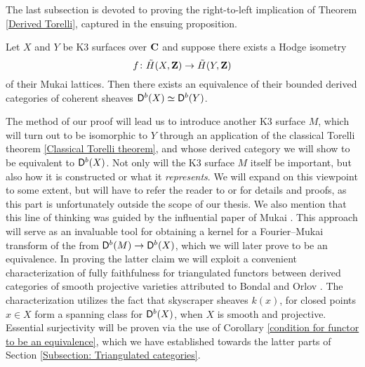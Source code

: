 The last subsection is devoted to proving the right-to-left implication of Theorem \ref{Derived Torelli}, captured in the ensuing proposition.

\begin{proposition}
    \label{Hodge isometry implies D equivalence}
    Let $X$ and $Y$ be K3 surfaces over $\mathbf C$ and suppose there exists a Hodge isometry 
    \[
        f \colon \,\tilde{\!{H}}(X, \mathbf Z) \to \,\tilde{\!{H}}(Y, \mathbf Z)
    \]
    of their Mukai lattices. Then there exists an equivalence of their bounded derived categories of coherent sheaves $\mathsf{D}^b(X) \simeq \mathsf{D}^b(Y)$.
\end{proposition}
The method of our proof will lead us to introduce another K3 surface $M$, which will turn out to be isomorphic to $Y$ through an application of the classical Torelli theorem \ref{Classical Torelli theorem}, and whose derived category we will show to be equivalent to $\mathsf{D}^b(X)$. Not only will the K3 surface $M$ itself be important, but also how it is constructed or what it \emph{represents}. We will expand on this viewpoint to some extent, but will have to refer the reader to \cite{HuybrechtsLehn2010} or \cite{vanBree2020} for details and proofs, as this part is unfortunately outside the scope of our thesis. We also mention that this line of thinking was guided by the influential paper of Mukai \cite{Mukai1987}. This approach will serve as an invaluable tool for obtaining a kernel for a Fourier--Mukai transform of the from $\mathsf{D}^b(M) \to \mathsf{D}^b(X)$, which we will later prove to be an equivalence. 
In proving the latter claim we will exploit a convenient characterization of fully faithfulness for triangulated functors between derived categories of smooth projective varieties attributed to Bondal and Orlov \cite{BondalOrlov1995}.  
The characterization utilizes the fact that skyscraper sheaves $k(x)$, for closed points $x \in X$ form a spanning class for $\mathsf{D}^b(X)$, when $X$ is smooth and projective. 
Essential surjectivity will be proven via the use of Corollary \ref{condition for functor to be an equivalence}, which we have established towards the latter parts of Section \ref{Subsection: Triangulated categories}.


